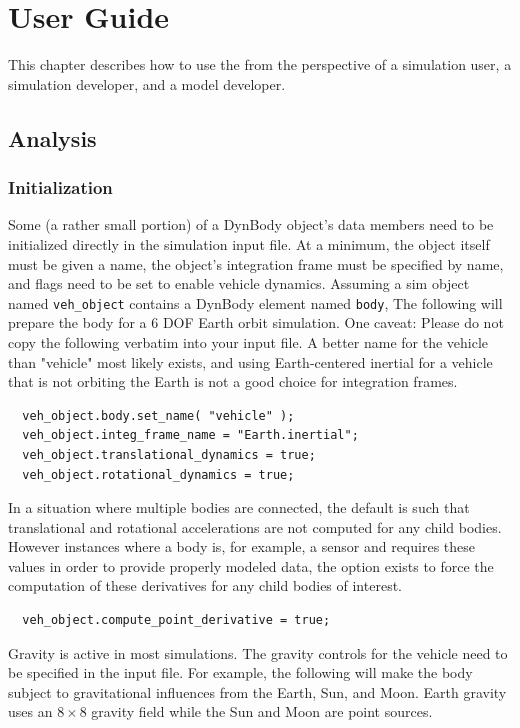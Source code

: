 \chapter{User Guide}\label{ch:user}
This chapter describes how to use the \ModelDesc from the
perspective of a simulation user, a simulation developer,
and a model developer.

\section{Analysis}

\subsection{Initialization}
Some (a rather small portion) of a DynBody object's data members need to
be initialized directly in the simulation input file. At a minimum,
the object itself must be given a name,
the object's integration frame must be specified by name, and
flags need to be set to enable vehicle dynamics.
Assuming a sim object
named \verb+veh_object+ contains a DynBody element named \verb+body+,
The following will prepare the body for a 6 DOF Earth orbit simulation.
One caveat: Please do not copy the following verbatim into your input file.
A better name for the vehicle than "vehicle" most likely exists,
and using Earth-centered inertial for a vehicle that is not orbiting the
Earth is not a good choice for integration frames.

\begin{verbatim}
  veh_object.body.set_name( "vehicle" );
  veh_object.integ_frame_name = "Earth.inertial";
  veh_object.translational_dynamics = true;
  veh_object.rotational_dynamics = true;
\end{verbatim}

In a situation where multiple bodies are connected, the default is such that translational
and rotational accelerations are not computed for any child bodies.  However instances
where a body is, for example, a sensor and requires these values in order to provide
properly modeled data, the option exists to force the computation of these derivatives for any child bodies of interest.
\begin{verbatim}
  veh_object.compute_point_derivative = true;
\end{verbatim}

Gravity is active in most simulations. The gravity controls for the
vehicle need to be specified in the input file. For example, the following
will make the body subject to gravitational influences from the Earth, Sun,
and Moon. Earth gravity uses an $8\times8$ gravity field while the Sun
and Moon are point sources.

